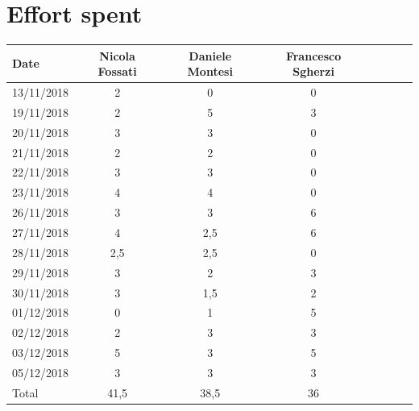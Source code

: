 \documentclass[a4paper,oneside,11pt]{article}
\begin{document}
    \section{Effort spent}
        \begin{tabular}{l*{6}{c}r}
            Date & Nicola Fossati & Daniele Montesi & Francesco Sgherzi \\
            \hline
            13/11/2018 & 2 & 0 & 0   \\
            \hline
            19/11/2018 & 2 & 5 & 3   \\
            \hline
            20/11/2018 & 3 & 3 & 0   \\
            \hline
            21/11/2018 & 2 & 2 & 0   \\
            \hline
            22/11/2018 & 3 & 3 & 0   \\
            \hline
            23/11/2018 & 4 & 4 & 0   \\
            \hline
            26/11/2018 & 3 & 3 & 6   \\
            \hline
            27/11/2018 & 4 & 2,5 & 6   \\
            \hline
            28/11/2018 & 2,5 & 2,5 & 0   \\
            \hline
            29/11/2018 & 3 & 2 & 3   \\
            \hline
            30/11/2018 & 3 & 1,5 & 2   \\
            \hline
            01/12/2018 & 0 & 1 & 5   \\
            \hline
            02/12/2018 & 2 & 3 & 3   \\
            \hline
            03/12/2018 & 5 & 3 & 5   \\
            \hline
            05/12/2018 & 3 & 3 & 3   \\
            \hline
            Total & 41,5 & 38,5 & 36   \\
        \end{tabular}
\end{document}
